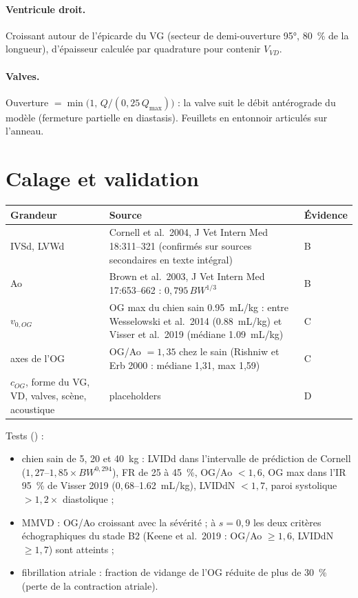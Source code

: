 \documentclass[10pt,a4paper]{article}
\newcommand{\vp}[1]{\texttt{\detokenize{#1}}}
\begin{document}
\paragraph{Ventricule droit.} Croissant autour de l'épicarde du VG (secteur de demi-ouverture \ang{95}, 80~\% de la
longueur), d'épaisseur calculée par quadrature pour contenir $V_{VD}$.

\paragraph{Valves.} Ouverture $=\min\bigl(1,\,Q/(0{,}25\,Q_{\max})\bigr)$ : la valve suit le débit antérograde du modèle
(fermeture partielle en diastasis). Feuillets en entonnoir articulés sur l'anneau.

\section{Calage et validation}
\begin{tabularx}{\linewidth}{@{}lXl@{}}
\toprule
Grandeur & Source & Évidence\\\midrule
IVSd, LVWd & Cornell et al.\ 2004, J Vet Intern Med 18:311--321 (confirmés sur sources secondaires en texte intégral) & B\\
Ao & Brown et al.\ 2003, J Vet Intern Med 17:653--662 : $0{,}795\,BW^{1/3}$ & B\\
$v_{0,OG}$ & OG max du chien sain \SI{0,95}{mL/kg} : entre Wesselowski et al.\ 2014 (\SI{0,88}{mL/kg}) et Visser et al.\ 2019 (médiane \SI{1,09}{mL/kg}) & C\\
axes de l'OG & OG/Ao $=1{,}35$ chez le sain (Rishniw et Erb 2000 : médiane 1,31, max 1,59) & C\\
$c_{OG}$, forme du VG, VD, valves, scène, acoustique & placeholders & D\\
\bottomrule
\end{tabularx}

Tests (\vp{cargo test -p vetsim-api echo_}) :
\begin{itemize}
\item chien sain de 5, 20 et \SI{40}{kg} : LVIDd dans l'intervalle de prédiction de Cornell ($1{,}27$--$1{,}85\times BW^{0{,}294}$),
FR de 25 à 45~\%, OG/Ao $<1{,}6$, OG max dans l'IR 95~\% de Visser 2019 ($0{,}68$--\SI{1,62}{mL/kg}), LVIDdN $<1{,}7$,
paroi systolique $>1{,}2\times$ diastolique ;
\item MMVD : OG/Ao croissant avec la sévérité ; à $s=0{,}9$ les deux critères échographiques du stade B2 (Keene et al.\ 2019 :
OG/Ao $\ge 1{,}6$, LVIDdN $\ge 1{,}7$) sont atteints ;
\item fibrillation atriale : fraction de vidange de l'OG réduite de plus de 30~\% (perte de la contraction atriale).
\end{itemize}
\end{document}
